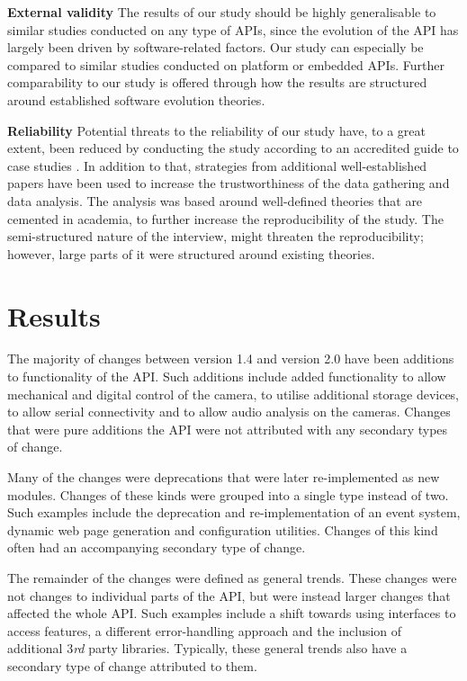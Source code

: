 \documentclass{sig-alternate}
\begin{document}
\smallskip \noindent
\textbf{External validity  } The results of our study should be highly generalisable to similar studies conducted on any type of APIs, since the evolution of the API has largely been driven by software-related factors. Our study can especially be compared to similar studies conducted on platform or embedded APIs. Further comparability to our study is offered through how the results are structured around established software evolution theories. 

\smallskip \noindent
\textbf{Reliability  } Potential threats to the reliability of our study have, to a great extent, been reduced by conducting the study according to an accredited guide to case studies \cite{runeson2009guidelines}. In addition to that, strategies from additional well-established papers \cite{andersson2007spiral, seaman1999qualitative, robson2002real} have been used to increase the trustworthiness of the data gathering and data analysis. The analysis was based around well-defined theories that are cemented in academia, to further increase the reproducibility of the study. The semi-structured nature of the interview, might threaten the reproducibility; however, large parts of it were structured around existing theories. 




\section{Results} \label{results} 


The majority of changes between version 1.4 and version 2.0 have been additions to functionality of the API. Such additions include added functionality to allow mechanical and digital control of the camera, to utilise additional storage devices, to allow serial connectivity and to allow audio analysis on the cameras. Changes that were pure additions the API were not attributed with any secondary types of change.

Many of the changes were deprecations that were later re-implemented as new modules. Changes of these kinds were grouped into a single type instead of two. Such examples include the deprecation and re-implementation of an event system, dynamic web page generation and configuration utilities. Changes of this kind often had an accompanying secondary type of change.

The remainder of the changes were defined as general trends. These changes were not changes to individual parts of the API, but were instead larger changes that affected the whole API. Such examples include a shift towards using interfaces to access features, a different error-handling approach and the inclusion of additional 3\textit{rd} party libraries. Typically, these general trends also have a secondary type of change attributed to them.
\end{document}
